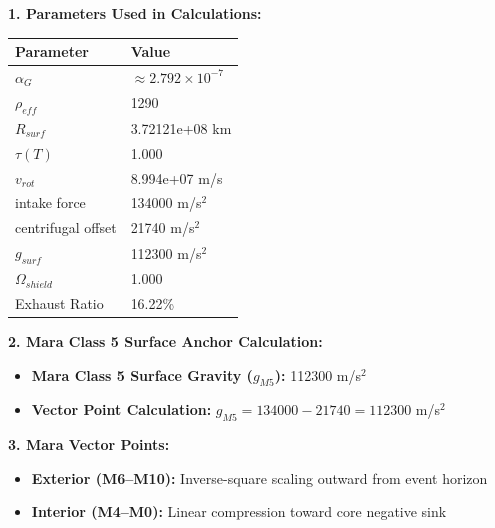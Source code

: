 \documentclass[11pt, a4paper]{article}
\begin{document}
\vspace{0.5em}
\noindent \textbf{1. Parameters Used in Calculations:}
\begin{center}
  \begin{tabular}{|l|l|}
    \hline
    \textbf{Parameter} & \textbf{Value} \\ \hline
    $\alpha_G$ & $\approx 2.792 \times 10^{-7}$ \\ \hline
    $\rho_{eff}$ & 1290 \\ \hline
    $R_{surf}$ & 3.72121e+08 km \\ \hline
    $\tau(T)$ & 1.000 \\ \hline
    $v_{rot}$ & 8.994e+07 m/s \\ \hline
    intake force & 134000 m/s$^2$ \\ \hline
    centrifugal offset & 21740 m/s$^2$ \\ \hline
    $g_{surf}$ & 112300 m/s$^2$ \\ \hline
    $\Omega_{shield}$ & 1.000 \\ \hline
    Exhaust Ratio & 16.22\% \\ \hline
  \end{tabular}
\end{center}

\vspace{0.5em}
\noindent \textbf{2. Mara Class 5 Surface Anchor Calculation:}
\begin{itemize}
  \item \textbf{Mara Class 5 Surface Gravity ($g_{M5}$):} 112300 m/s$^2$
  \item \textbf{Vector Point Calculation:} $g_{M5} = 134000 - 21740 = 112300$ m/s$^2$
\end{itemize}

\vspace{0.5em}
\noindent \textbf{3. Mara Vector Points:}
\begin{itemize}
  \item \textbf{Exterior (M6--M10):} Inverse-square scaling outward from event horizon
  \item \textbf{Interior (M4--M0):} Linear compression toward core negative sink
\end{itemize}
\end{document}
